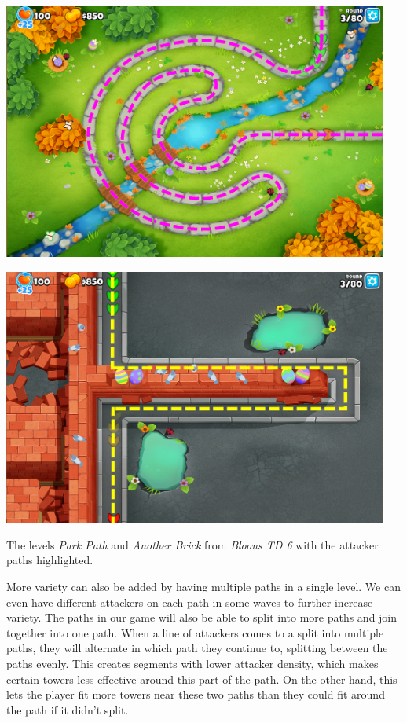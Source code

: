 \begin{center}
    \captionsetup{type=figure}
    \begin{minipage}{.5\textwidth}
        \centering
        \includegraphics[width=0.95\textwidth]{img/Bloons-TD6-Park-Path-Highlighted.png}
    \end{minipage}%
    \begin{minipage}{.5\textwidth}
        \centering
        \includegraphics[width=0.95\textwidth]{img/Bloons-TD6-Another-Brick-Highlighted.png}
    \end{minipage}
    \caption{The levels \emph{Park Path} and \emph{Another Brick} from \emph{Bloons TD 6} with the attacker paths highlighted.}
    \label{fig:btd6-maps}
\end{center}

More variety can also be added by having multiple paths in a single level.
We can even have different attackers on each path in some waves to further increase variety.
The paths in our game will also be able to split into more paths and join together into one path.
When a line of attackers comes to a split into multiple paths, they will alternate in which path they continue to, splitting between the paths evenly.
This creates segments with lower attacker density, which makes certain towers less effective around this part of the path.
On the other hand, this lets the player fit more towers near these two paths than they could fit around the path if it didn't split.

